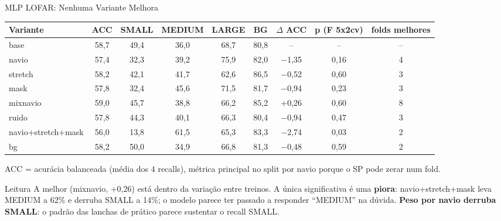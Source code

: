 \documentclass[aspectratio=169]{beamer}
\newcommand{\calo}[1]{\cellcolor{red!20}#1}
\newcommand{\camd}[1]{\cellcolor{yellow!35}#1}
\begin{document}
\begin{frame}{MLP LOFAR: Nenhuma Variante Melhora}
    \footnotesize
    \begin{table}
    \centering
    \scriptsize
    \setlength{\tabcolsep}{4pt}
    \begin{tabular}{lcccccccc}
    \toprule
    Variante & ACC & SMALL & MEDIUM & LARGE & BG & $\Delta$ ACC & p (F 5x2cv) & folds melhores \\
    \midrule
    base & 58,7 & 49,4 & 36,0 & 68,7 & 80,8 & -- & -- & -- \\
    navio & 57,4 & \calo{32,3} & 39,2 & 75,9 & 82,0 & $-$1,35 & 0,16 & 4 \\
    stretch & 58,2 & 42,1 & 41,7 & 62,6 & 86,5 & $-$0,52 & 0,60 & 3 \\
    mask & 57,8 & 32,4 & 45,6 & 71,5 & 81,7 & $-$0,94 & 0,23 & 3 \\
    mixnavio & 59,0 & 45,7 & 38,8 & 66,2 & 85,2 & +0,26 & 0,60 & 8 \\
    ruido & 57,8 & 44,3 & 40,1 & 66,3 & 80,4 & $-$0,94 & 0,47 & 3 \\
    navio+stretch+mask & 56,0 & \calo{13,8} & \camd{61,5} & 65,3 & 83,3 & \calo{$-$2,74} & \calo{0,03} & 2 \\
    bg & 58,2 & 50,0 & 34,9 & 66,8 & 81,3 & $-$0,48 & 0,59 & 2 \\
    \bottomrule
    \end{tabular}
    \end{table}
    {\tiny ACC = acurácia balanceada (média dos 4 recalls), métrica principal no split por navio porque o SP pode zerar num fold.\par}
    \vspace{0.1cm}
    \begin{alertblock}{Leitura}
        \scriptsize
        A melhor (mixnavio, +0,26) está dentro da variação entre treinos. A única significativa é uma \textbf{piora}: navio+stretch+mask leva MEDIUM a 62\% e derruba SMALL a 14\%; o modelo parece ter passado a responder ``MEDIUM'' na dúvida. \textbf{Peso por navio derruba SMALL}: o padrão das lanchas de prático parece sustentar o recall SMALL.
    \end{alertblock}
\end{frame}
\end{document}
